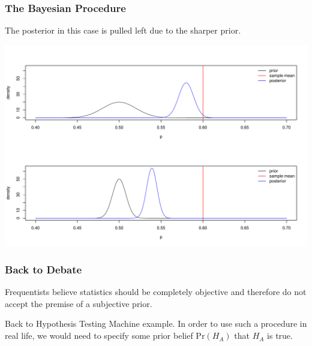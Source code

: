 \documentclass[slides]{beamer}
\newcommand{\blue}[1]{\textcolor{blue2}{#1}}
\newcommand{\prob}{\mbox{Pr}}
\begin{document}
\begin{frame}
\frametitle{The Bayesian Procedure}
The posterior in this case is pulled left due to the sharper prior.
\begin{center}
\includegraphics[width=\textwidth]{figure/bayes6.pdf} 
\end{center}

\end{frame}


\begin{frame}
\frametitle{Back to Debate}

Frequentists believe statistics should be completely \blue{objective} and therefore do not accept the premise of a subjective prior.  

\pause\vspace{0.5cm}

Back to Hypothesis Testing Machine example.  In order to use such a procedure in real life, we would need to specify some prior belief $\prob(H_A)$ that $H_A$ is true.  

%

\end{frame}
\end{document}
